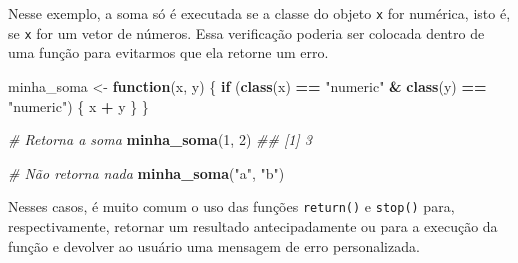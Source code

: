 \documentclass[]{book}
\newenvironment{Shaded}{\begin{snugshade}}{\end{snugshade}}
\newcommand{\CommentTok}[1]{\textcolor[rgb]{0.56,0.35,0.01}{\textit{#1}}}
\newcommand{\ControlFlowTok}[1]{\textcolor[rgb]{0.13,0.29,0.53}{\textbf{#1}}}
\newcommand{\DecValTok}[1]{\textcolor[rgb]{0.00,0.00,0.81}{#1}}
\newcommand{\KeywordTok}[1]{\textcolor[rgb]{0.13,0.29,0.53}{\textbf{#1}}}
\newcommand{\NormalTok}[1]{#1}
\newcommand{\OperatorTok}[1]{\textcolor[rgb]{0.81,0.36,0.00}{\textbf{#1}}}
\newcommand{\StringTok}[1]{\textcolor[rgb]{0.31,0.60,0.02}{#1}}
\begin{document}
Nesse exemplo, a soma só é executada se a classe do objeto \texttt{x} for numérica, isto é, se \texttt{x} for um vetor de números. Essa verificação poderia ser colocada dentro de uma função para evitarmos que ela retorne um erro.

\begin{Shaded}
\begin{Highlighting}[]
\NormalTok{minha_soma <-}\StringTok{ }\ControlFlowTok{function}\NormalTok{(x, y) \{}
  \ControlFlowTok{if}\NormalTok{ (}\KeywordTok{class}\NormalTok{(x) }\OperatorTok{==}\StringTok{ "numeric"} \OperatorTok{&}\StringTok{ }\KeywordTok{class}\NormalTok{(y) }\OperatorTok{==}\StringTok{ "numeric"}\NormalTok{) \{}
\NormalTok{     x }\OperatorTok{+}\StringTok{ }\NormalTok{y}
\NormalTok{  \}}
\NormalTok{\}}

\CommentTok{# Retorna a soma}
\KeywordTok{minha_soma}\NormalTok{(}\DecValTok{1}\NormalTok{, }\DecValTok{2}\NormalTok{)}
\CommentTok{## [1] 3}

\CommentTok{# Não retorna nada}
\KeywordTok{minha_soma}\NormalTok{(}\StringTok{"a"}\NormalTok{, }\StringTok{"b"}\NormalTok{)}
\end{Highlighting}
\end{Shaded}

Nesses casos, é muito comum o uso das funções \texttt{return()} e \texttt{stop()} para, respectivamente, retornar um resultado antecipadamente ou para a execução da função e devolver ao usuário uma mensagem de erro personalizada.
\end{document}
